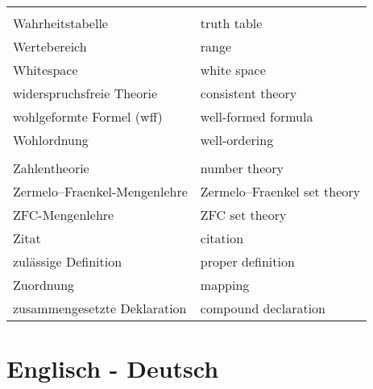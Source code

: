 \begin{longtabu}   { @{} X[l] X[l] }
     & \\
    Wahrheitstabelle & truth table \\
    Wertebereich & range \\
    Whitespace & white space \\
    widerspruchsfreie Theorie & consistent theory \\
    wohlgeformte Formel (wff) & well-formed formula \\
    Wohlordnung & well-ordering \\
     & \\
    Zahlentheorie & number theory \\
    Zermelo--Fraenkel-{\allowbreak}Mengenlehre & Zermelo--Fraenkel set theory \\
    ZFC-Mengenlehre & ZFC set theory \\
    Zitat & citation \\
    zulässige Definition & proper definition \\
    Zuordnung & mapping \\
    zusammengesetzte Deklaration & compound declaration \\ 
  \end{longtabu}
  \pagebreak


\section{Englisch - Deutsch}

